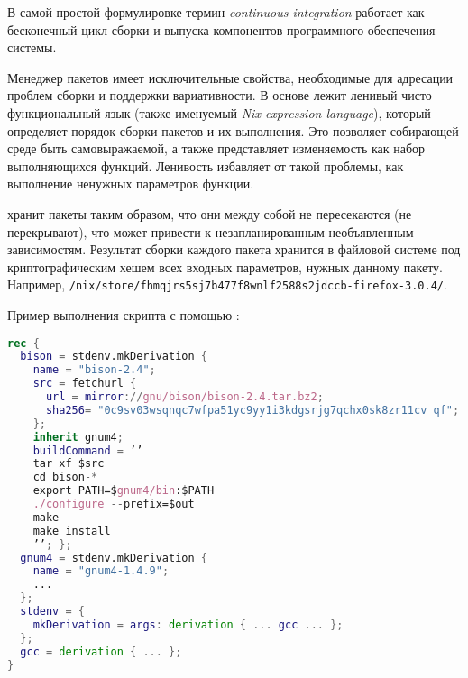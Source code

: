 В самой простой формулировке термин \emph{continuous integration} работает
как бесконечный цикл сборки и выпуска компонентов программного обеспечения системы.

Менеджер пакетов \nix \cite{hydra_manager} имеет исключительные свойства, необходимые для адресации проблем сборки и поддержки вариативности. В основе \nix лежит ленивый чисто функциональный язык (также именуемый \emph{Nix expression language}), который определяет порядок сборки пакетов и их выполнения. Это позволяет собирающей среде быть самовыражаемой, а также представляет изменяемость как набор выполняющихся функций. Ленивость избавляет от такой проблемы, как выполнение ненужных параметров функции.

\nix хранит пакеты таким образом, что они между собой не пересекаются (не перекрывают), что может привести к незапланированным необъявленным зависимостям. Результат сборки каждого пакета хранится в файловой системе под криптографическим хешем всех входных параметров, нужных данному пакету. Например, \linebreak\lstinline{/nix/store/fhmqjrs5sj7b477f8wnlf2588s2jdccb-firefox-3.0.4/}.

Пример выполнения скрипта с помощью \nix:

\begin{lstlisting}[language=Nix]
rec {
  bison = stdenv.mkDerivation {
    name = "bison-2.4";
    src = fetchurl {
      url = mirror://gnu/bison/bison-2.4.tar.bz2;
      sha256= "0c9sv03wsqnqc7wfpa51yc9yy1i3kdgsrjg7qchx0sk8zr11cv qf";
    };
    inherit gnum4;
    buildCommand = ’’
    tar xf $src
    cd bison-*
    export PATH=$gnum4/bin:$PATH
    ./configure --prefix=$out
    make
    make install
    ’’; };
  gnum4 = stdenv.mkDerivation {
    name = "gnum4-1.4.9";
    ...
  };
  stdenv = {
    mkDerivation = args: derivation { ... gcc ... };
  };
  gcc = derivation { ... };
}
\end{lstlisting}
